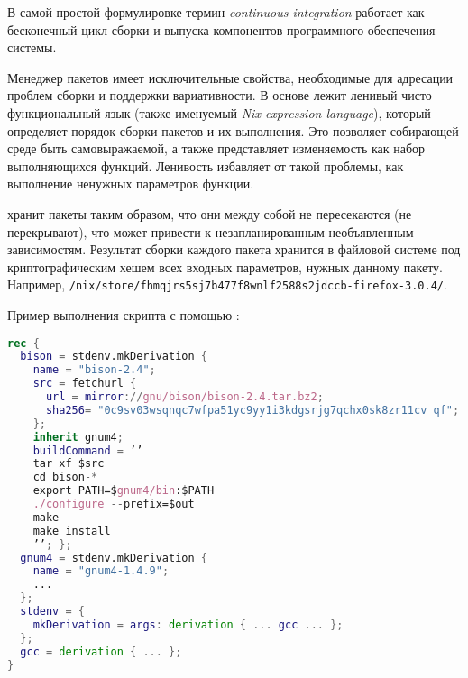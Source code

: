 В самой простой формулировке термин \emph{continuous integration} работает
как бесконечный цикл сборки и выпуска компонентов программного обеспечения системы.

Менеджер пакетов \nix \cite{hydra_manager} имеет исключительные свойства, необходимые для адресации проблем сборки и поддержки вариативности. В основе \nix лежит ленивый чисто функциональный язык (также именуемый \emph{Nix expression language}), который определяет порядок сборки пакетов и их выполнения. Это позволяет собирающей среде быть самовыражаемой, а также представляет изменяемость как набор выполняющихся функций. Ленивость избавляет от такой проблемы, как выполнение ненужных параметров функции.

\nix хранит пакеты таким образом, что они между собой не пересекаются (не перекрывают), что может привести к незапланированным необъявленным зависимостям. Результат сборки каждого пакета хранится в файловой системе под криптографическим хешем всех входных параметров, нужных данному пакету. Например, \linebreak\lstinline{/nix/store/fhmqjrs5sj7b477f8wnlf2588s2jdccb-firefox-3.0.4/}.

Пример выполнения скрипта с помощью \nix:

\begin{lstlisting}[language=Nix]
rec {
  bison = stdenv.mkDerivation {
    name = "bison-2.4";
    src = fetchurl {
      url = mirror://gnu/bison/bison-2.4.tar.bz2;
      sha256= "0c9sv03wsqnqc7wfpa51yc9yy1i3kdgsrjg7qchx0sk8zr11cv qf";
    };
    inherit gnum4;
    buildCommand = ’’
    tar xf $src
    cd bison-*
    export PATH=$gnum4/bin:$PATH
    ./configure --prefix=$out
    make
    make install
    ’’; };
  gnum4 = stdenv.mkDerivation {
    name = "gnum4-1.4.9";
    ...
  };
  stdenv = {
    mkDerivation = args: derivation { ... gcc ... };
  };
  gcc = derivation { ... };
}
\end{lstlisting}
